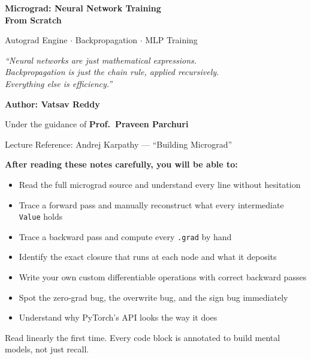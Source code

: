 \documentclass[12pt,a4paper]{article}
\newcommand{\code}[1]{\texttt{\small\color{deepblue}#1}}
\begin{document}

\begin{titlepage}
\centering
\vspace*{1.5cm}
{\Huge\bfseries\color{deepblue} Micrograd: Neural Network Training\\[6pt]
From Scratch\par}
\vspace{0.4cm}
{\large\color{gray} Autograd Engine $\cdot$ Backpropagation $\cdot$ MLP Training\par}
\vspace{1.2cm}
\begin{tcolorbox}[colback=deepblue!8,colframe=deepblue,width=0.85\textwidth]
\centering
\textit{``Neural networks are just mathematical expressions.\\
Backpropagation is just the chain rule, applied recursively.\\
Everything else is efficiency.''}
\end{tcolorbox}
\vspace{1.2cm}
{\large\bfseries Author: Vatsav Reddy\par}
{\normalsize Under the guidance of \textbf{Prof.\ Praveen Parchuri}\par}
\vspace{1cm}
{\normalsize\color{gray} Lecture Reference: Andrej Karpathy — ``Building Micrograd''\par}
\vspace{0.8cm}
\begin{tcolorbox}[colback=stickycolor,colframe=stickyborder,width=0.85\textwidth]
\textbf{After reading these notes carefully, you will be able to:}
\begin{itemize}
  \item Read the full micrograd source and understand every line without hesitation
  \item Trace a forward pass and manually reconstruct what every intermediate \code{Value} holds
  \item Trace a backward pass and compute every \code{.grad} by hand
  \item Identify the exact closure that runs at each node and what it deposits
  \item Write your own custom differentiable operations with correct backward passes
  \item Spot the zero-grad bug, the overwrite bug, and the sign bug immediately
  \item Understand why PyTorch's API looks the way it does
\end{itemize}
\end{tcolorbox}
\vfill
{\small\color{gray} Read linearly the first time. Every code block is annotated to build mental models, not just recall.\par}
\end{titlepage}
\end{document}
